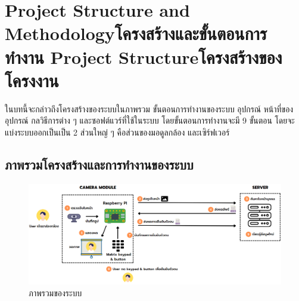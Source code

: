 \chapter{\ifproject%
\ifenglish Project Structure and Methodology\else โครงสร้างและขั้นตอนการทำงาน\fi
\else%
\ifenglish Project Structure\else โครงสร้างของโครงงาน\fi
\fi
}

ในบทนี้จะกล่าวถึงโครงสร้างของระบบในภาพรวม ขั้นตอนการทํางานของระบบ อุปกรณ์ หน้าที่ของอุปกรณ์ กลวิธีการต่าง ๆ และซอฟต์แวร์ที่ใช้ในระบบ โดยขั้นตอนการทํางานจะมี 9 ขั้นตอน
โดยจะแบ่งระบบออกเป็นเป็น 2 ส่วนใหญ่ ๆ คือส่วนของมอดูลกล้อง และเซิร์ฟเวอร์

\makeatletter


\makeatother

\section{ภาพรวมโครงสร้างและการทำงานของระบบ}


\begin{figure}[ht!]
  \begin{center}
    \includegraphics[scale=.5]{pic/overview.png}
  \caption[ภาพรวมของระบบ]{ภาพรวมของระบบ}
  \end{center}
  \label{fig:overview}
\end{figure}

